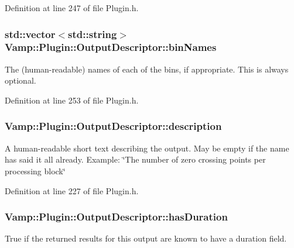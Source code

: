 Definition at line 247 of file Plugin.\+h.

\subsubsection[{\texorpdfstring{bin\+Names}{binNames}}]{\setlength{\rightskip}{0pt plus 5cm}std\+::vector$<${\bf std\+::string}$>$ Vamp\+::\+Plugin\+::\+Output\+Descriptor\+::bin\+Names}\hypertarget{struct_vamp_1_1_plugin_1_1_output_descriptor_a31d9b79e2d8241344f551a22fcb5c8c7}{}\label{struct_vamp_1_1_plugin_1_1_output_descriptor_a31d9b79e2d8241344f551a22fcb5c8c7}
The (human-\/readable) names of each of the bins, if appropriate. This is always optional. 

Definition at line 253 of file Plugin.\+h.

\subsubsection[{\texorpdfstring{description}{description}}]{ Vamp\+::\+Plugin\+::\+Output\+Descriptor\+::description}\hypertarget{struct_vamp_1_1_plugin_1_1_output_descriptor_af9b4fe8f78e7126ead820ba5dc55efd1}{}\label{struct_vamp_1_1_plugin_1_1_output_descriptor_af9b4fe8f78e7126ead820ba5dc55efd1}
A human-\/readable short text describing the output. May be empty if the name has said it all already. Example\+: \char`\"{}\+The number of zero crossing points per processing block\char`\"{} 

Definition at line 227 of file Plugin.\+h.

\subsubsection[{\texorpdfstring{has\+Duration}{hasDuration}}]{ Vamp\+::\+Plugin\+::\+Output\+Descriptor\+::has\+Duration}\hypertarget{struct_vamp_1_1_plugin_1_1_output_descriptor_ab0d7cc6ab19e53b5bd12ee234f549ea3}{}\label{struct_vamp_1_1_plugin_1_1_output_descriptor_ab0d7cc6ab19e53b5bd12ee234f549ea3}
True if the returned results for this output are known to have a duration field. 

